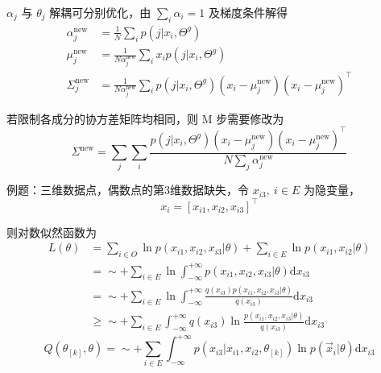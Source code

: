 \documentclass[openany]{ctexbook}
\theoremstyle{kaiti}
\theoremstyle{normal}
\begin{document}
$\alpha_j$ 与 $\theta_j$ 解耦可分别优化，由 $\sum_i\alpha_i=1$ 及梯度条件解得
\begin{equation}
\begin{aligned}
  \alpha_{j}^{\mathrm{new}}&=\frac{1}{N}\sum_ip\left(j|x_i,\Theta ^g \right)\\ 
  \mu_{j}^{\mathrm{new}}&=\frac{1}{N\alpha_{j}^{\mathrm{new}}}\sum_ix_ip\left(j|x_i,\Theta ^g \right)\\
  \Sigma_{j}^{\mathrm{new}}&=\frac{1}{N\alpha_{j}^{\mathrm{new}}}\sum_ip\left(j|x_i,\Theta ^g \right)\left(x_i-\mu_{j}^{\mathrm{new}} \right)\left(x_i-\mu_{j}^{\mathrm{new}} \right)^{\top}
\end{aligned}
\end{equation}

若限制各成分的协方差矩阵均相同，则 M 步需要修改为
\begin{equation}
\Sigma ^{\mathrm{new}}=\sum_{j}\sum_i\frac{p\left(j|x_i,\Theta ^g \right)\left(x_i-\mu_{j}^{\mathrm{new}} \right)\left(x_i-\mu_{j}^{\mathrm{new}} \right)^{\top}}{N\sum_j\alpha_{j}^{\mathrm{new}}}
\end{equation}

例题：三维数据点，偶数点的第3维数据缺失，令 $x_{i3},~i\in E$ 为隐变量，
\begin{equation}
x_i=\left[x_{i1},x_{i2},x_{i3} \right] ^{\top}
\end{equation}

则对数似然函数为
\begin{equation}
\begin{aligned}
  L(\theta)
  &=\sum_{i\in O}\ln p\left(x_{i1},x_{i2},x_{i3}|\theta \right)+\sum_{i\in E}\ln p\left(x_{i1},x_{i2}|\theta \right)\\
  &=\sim +\sum_{i\in E}\ln \int_{-\infty}^{+\infty}p\left(x_{i1},x_{i2},x_{i3}|\theta \right)\mathrm{d}x_{i3}\\
  &=\sim +\sum_{i\in E}\ln \int_{-\infty}^{+\infty}\frac{q\left(x_{i3} \right)p\left(x_{i1},x_{i2},x_{i3}|\theta \right)}{q\left(x_{i3} \right)}\mathrm{d}x_{i3}\\
  &\geqslant \sim +\sum_{i\in E}\int_{-\infty}^{+\infty}q\left(x_{i3} \right)\ln\frac{p\left(x_{i1},x_{i2},x_{i3}|\theta \right)}{q\left(x_{i3} \right)} \mathrm{d}x_{i3}
\end{aligned}
\end{equation}
\begin{equation}
Q\left(\theta_{\left[k \right]},\theta \right)=\sim +\sum_{i\in E}\int_{-\infty}^{+\infty}p\left(x_{i3}|x_{i1},x_{i2},\theta_{\left[k \right]} \right)\ln p\left(\vec{x}_i|\theta \right)\mathrm{d}x_{i3}
\end{equation}
\end{document}
